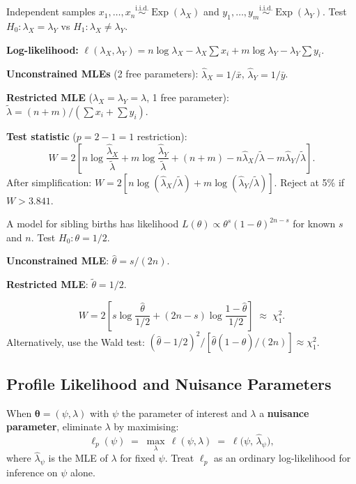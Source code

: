 \documentclass[11pt, a4paper]{article}
\newcommand{\iid}{\overset{\text{i.i.d.}}{\sim}}
\newcommand{\hth}{\hat{\theta}}
\newcommand{\tth}{\tilde{\theta}}
\begin{document}
\begin{exbox}[Two Exponential rates --- $H_0\colon \lambda_X = \lambda_Y$]
Independent samples $x_1,\ldots,x_n \iid \operatorname{Exp}(\lambda_X)$ and $y_1,\ldots,y_m \iid \operatorname{Exp}(\lambda_Y)$. Test $H_0\colon \lambda_X = \lambda_Y$ vs $H_1\colon \lambda_X \neq \lambda_Y$.

\textbf{Log-likelihood:}
$\ell(\lambda_X, \lambda_Y) = n\log\lambda_X - \lambda_X \sum x_i + m\log\lambda_Y - \lambda_Y \sum y_i.$

\textbf{Unconstrained MLEs} (2 free parameters):
$\hat{\lambda}_X = 1/\bar{x}$, $\hat{\lambda}_Y = 1/\bar{y}$.

\textbf{Restricted MLE} ($\lambda_X = \lambda_Y = \lambda$, 1 free parameter):
$\tilde{\lambda} = (n+m)/(\sum x_i + \sum y_i)$.

\textbf{Test statistic} ($p = 2 - 1 = 1$ restriction):
\[
  W = 2\!\left[n\log\frac{\hat{\lambda}_X}{\tilde{\lambda}} + m\log\frac{\hat{\lambda}_Y}{\tilde{\lambda}}
              + (n+m) - n\hat{\lambda}_X/\tilde\lambda - m\hat{\lambda}_Y/\tilde\lambda\right].
\]
After simplification: $W = 2[n\log(\hat\lambda_X/\tilde\lambda) + m\log(\hat\lambda_Y/\tilde\lambda)]$. Reject at 5\% if $W > 3.841$.
\end{exbox}

\begin{exbox}
A model for sibling births has likelihood $L(\theta) \propto \theta^s(1-\theta)^{2n-s}$ for known $s$ and $n$. Test $H_0\colon \theta = 1/2$.

\textbf{Unconstrained MLE}: $\hth = s/(2n)$.

\textbf{Restricted MLE}: $\tth = 1/2$.

\[
  W = 2\!\left[s\log\frac{\hth}{1/2} + (2n-s)\log\frac{1-\hth}{1/2}\right] \;\approx\; \chi^2_1.
\]
Alternatively, use the Wald test: $(\hth - 1/2)^2 / [\hth(1-\hth)/(2n)] \approx \chi^2_1$.
\end{exbox}

\subsection*{Profile Likelihood and Nuisance Parameters}

\begin{defbox}
When $\boldsymbol\theta = (\psi, \lambda)$ with $\psi$ the parameter of interest and $\lambda$ a \textbf{nuisance parameter}, eliminate $\lambda$ by maximising:
\[
  \ell_p(\psi) \;=\; \max_\lambda\,\ell(\psi, \lambda) \;=\; \ell\!\bigl(\psi,\,\hat{\lambda}_\psi\bigr),
\]
where $\hat{\lambda}_\psi$ is the MLE of $\lambda$ for fixed $\psi$. Treat $\ell_p$ as an ordinary log-likelihood for inference on $\psi$ alone.
\end{defbox}
\end{document}
